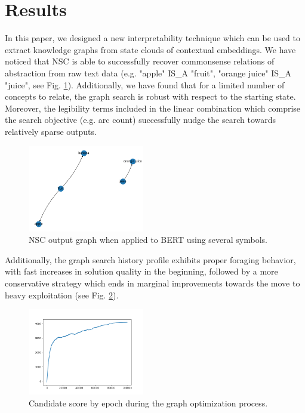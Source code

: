 \section{Results}\label{sec:results}

In this paper, we designed a new interpretability technique which can be used to extract knowledge graphs from state clouds of contextual embeddings. We have noticed that NSC is able to successfully recover commonsense relations of abstraction from raw text data (e.g. "apple" IS\_A "fruit", "orange juice" IS\_A "juice", see Fig. \ref{fig:nsc_output_graph}). Additionally, we have found that for a limited number of concepts to relate, the graph search is robust with respect to the starting state. Moreover, the legibility terms included in the linear combination which comprise the search objective (e.g. arc count) successfully nudge the search towards relatively sparse outputs.

\begin{figure}[h]
    \centering
    \includegraphics[width=0.45\textwidth]{img/distinct graphs.png}
    \caption{NSC output graph when applied to BERT using several symbols.}\label{fig:nsc_output_graph}
\end{figure}

Additionally, the graph search history profile exhibits proper foraging behavior, with fast increases in solution quality in the beginning, followed by a more conservative strategy which ends in marginal improvements towards the move to heavy exploitation (see Fig. \ref{fig:nsc_score_history}).

\begin{figure}[h]
    \centering
    \includegraphics[width=0.45\textwidth]{img/score1.png}
    \caption{Candidate score by epoch during the graph optimization process.}\label{fig:nsc_score_history}
\end{figure}

